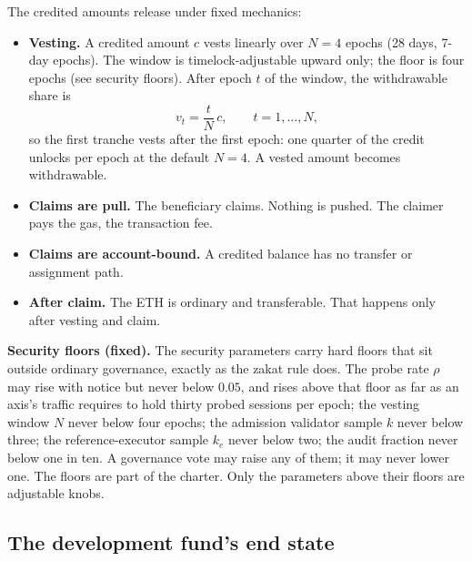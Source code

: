 \documentclass[11pt]{article}
\begin{document}
The credited amounts release under fixed mechanics:

\begin{itemize}
    \item \textbf{Vesting.} A credited amount $c$ vests linearly over
          $N=4$ epochs (28 days, 7-day epochs). The window is
          timelock-adjustable upward only; the floor is four epochs (see
          security floors). After epoch $t$ of the window, the
          withdrawable share is
          \begin{equation}
              v_t = \frac{t}{N} \, c, \qquad t = 1, \ldots, N,
          \end{equation}
          so the first tranche vests after the first epoch: one quarter
          of the credit unlocks per epoch at the default $N=4$. A vested
          amount becomes withdrawable.
    \item \textbf{Claims are pull.} The beneficiary claims. Nothing
          is pushed. The claimer pays the gas, the transaction fee.
    \item \textbf{Claims are account-bound.} A credited balance has
          no transfer or assignment path.
    \item \textbf{After claim.} The ETH is ordinary and transferable.
          That happens only after vesting and claim.
\end{itemize}

\textbf{Security floors (fixed).} The security parameters carry
hard floors that sit outside ordinary governance, exactly as the
zakat rule does. The probe rate $\rho$ may rise with notice but
never below $0.05$, and rises above that floor as far as an
axis's traffic requires to hold thirty probed sessions per epoch;
the vesting window $N$ never below four
epochs; the admission validator sample $k$ never below three; the
reference-executor sample $k_e$ never below two; the audit
fraction never below one in ten. A governance vote may raise any
of them; it may never lower one. The floors are part of the
charter. Only the parameters above their floors are adjustable
knobs.

\subsection{The development fund's end state}\label{sec:zakat}
\end{document}
